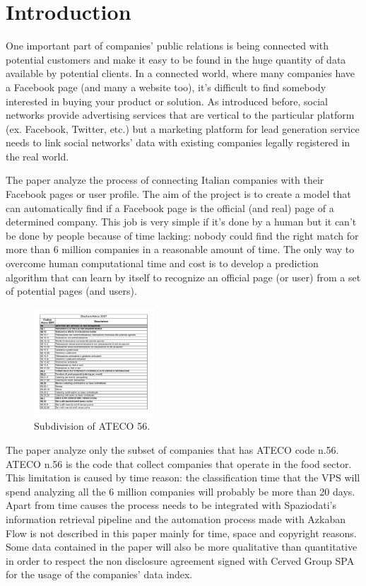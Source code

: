 \chapter{Introduction} %
One important part of companies' public relations is being connected with potential customers and make it easy to be found in the huge quantity of data available by potential clients. In a connected world, where many companies have a Facebook page (and many a website too), it's difficult to find somebody interested in buying your product or solution. As introduced before, social networks provide advertising services that are vertical to the particular platform (ex. Facebook, Twitter, etc.) but a marketing platform for lead generation service needs to link social networks' data with existing companies legally registered in the real world.

The paper analyze the process of connecting Italian companies with their Facebook pages or user profile.
The aim of the project is to create a model that can automatically find if a Facebook page is the official (and real) page of a determined company. This job is very simple if it's done by a human but it can't be done by people because of time lacking: nobody could find the right match for more than 6 million companies in a reasonable amount of time. The only way to overcome human computational time and cost is to develop a prediction algorithm that can learn by itself to recognize an official page (or user) from a set of potential pages (and users).

\begin{figure}
\centering
\includegraphics[width=0.4\textwidth]{img/ateco_tab.jpg}
\caption{Subdivision of ATECO 56.}
\label{Fig.1}
\end{figure}

The paper analyze only the subset of companies that has ATECO code n.56. ATECO n.56 is the code that collect companies that operate in the food sector\cite{istat}. This limitation is caused by time reason: the classification time that the VPS will spend analyzing all the 6 million companies will probably be more than 20 days. Apart from time causes the process needs to be integrated with Spaziodati's information retrieval pipeline and the automation process made with Azkaban Flow is not described in this paper mainly for time, space and copyright reasons. Some data contained in the paper will also be more qualitative than quantitative in order to respect the non disclosure agreement signed with Cerved Group SPA for the usage of the companies' data index.

